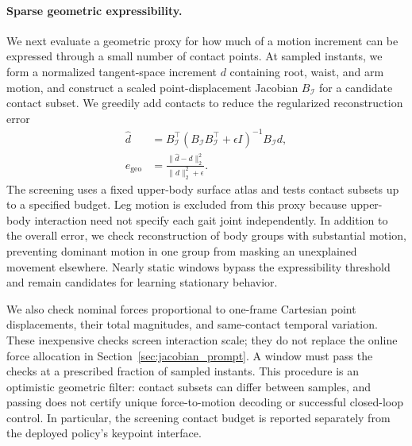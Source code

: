 \paragraph{Sparse geometric expressibility.}
We next evaluate a geometric proxy for how much of a motion increment can be expressed through a small number of contact points. At sampled instants, we form a normalized tangent-space increment $d$ containing root, waist, and arm motion, and construct a scaled point-displacement Jacobian $B_{\mathcal I}$ for a candidate contact subset. We greedily add contacts to reduce the regularized reconstruction error
\begin{equation}
    \begin{aligned}
    \hat d &= B_{\mathcal I}^{\top}
        (B_{\mathcal I}B_{\mathcal I}^{\top}+\epsilon I)^{-1}
        B_{\mathcal I}d, \\
    e_{\mathrm{geo}} &=
        \frac{\|\hat d-d\|_2^2}{\|d\|_2^2+\epsilon}.
    \end{aligned}
    \label{eq:data_expressibility}
\end{equation}
The screening uses a fixed upper-body surface atlas and tests contact subsets up to a specified budget. Leg motion is excluded from this proxy because upper-body interaction need not specify each gait joint independently. In addition to the overall error, we check reconstruction of body groups with substantial motion, preventing dominant motion in one group from masking an unexplained movement elsewhere. Nearly static windows bypass the expressibility threshold and remain candidates for learning stationary behavior.

We also check nominal forces proportional to one-frame Cartesian point displacements, their total magnitudes, and same-contact temporal variation. These inexpensive checks screen interaction scale; they do not replace the online force allocation in Section~\ref{sec:jacobian_prompt}. A window must pass the checks at a prescribed fraction of sampled instants. This procedure is an optimistic geometric filter: contact subsets can differ between samples, and passing does not certify unique force-to-motion decoding or successful closed-loop control. In particular, the screening contact budget is reported separately from the deployed policy's keypoint interface.

